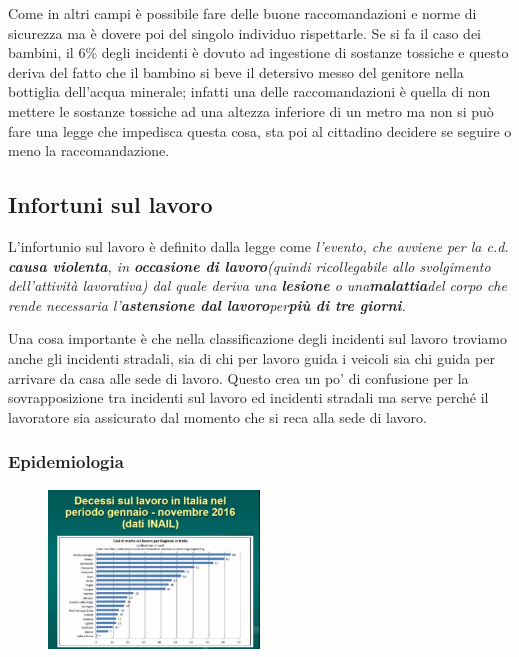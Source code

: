 Come in altri campi è possibile fare delle buone raccomandazioni e norme
di sicurezza ma è dovere poi del singolo individuo rispettarle. Se si fa
il caso dei bambini, il 6\% degli incidenti è dovuto ad ingestione di
sostanze tossiche e questo deriva del fatto che il bambino si beve il
detersivo messo del genitore nella bottiglia dell'acqua minerale;
infatti una delle raccomandazioni è quella di non mettere le sostanze
tossiche ad una altezza inferiore di un metro ma non si può fare una
legge che impedisca questa cosa, sta poi al cittadino decidere se
seguire o meno la raccomandazione.

\subsection{Infortuni sul lavoro}

L'infortunio sul lavoro è definito dalla legge come \emph{l'evento, che
avviene per la c.d. \textbf{causa violenta}, in \textbf{occasione di
lavoro}(quindi ricollegabile allo svolgimento dell'attività lavorativa)
dal quale deriva una \textbf{lesione} o una\textbf{malattia}del corpo
che rende necessaria l'\textbf{astensione dal lavoro}per\textbf{più di
tre giorni}.}

Una cosa importante è che nella classificazione degli incidenti sul
lavoro troviamo anche gli incidenti stradali, sia di chi per lavoro
guida i veicoli sia chi guida per arrivare da casa alle sede di lavoro.
Questo crea un po' di confusione per la sovrapposizione tra incidenti
sul lavoro ed incidenti stradali ma serve perché il lavoratore sia
assicurato dal momento che si reca alla sede di lavoro.

\subsubsection{Epidemiologia}

\begin{figure}[!ht]
\centering
	\includegraphics[width=0.5\textwidth]{28/image8.jpg}
	\end{figure}

